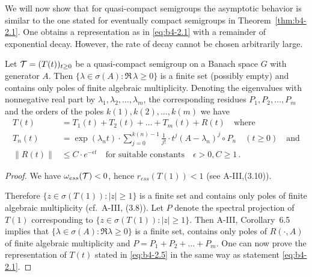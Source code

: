 %
%
We will now show that for quasi-compact semigroups the asymptotic behavior is similar to the one stated for eventually compact semigroups in Theorem~\ref{thm:b4-2.1}. 
One obtains a representation as in \eqref{eq:b4-2.1} with a remainder of exponential decay. 
However, the rate of decay cannot be chosen arbitrarily large.
\begin{theorem}\label{thm:b4-2.10}
	Let $\mathcal{T} = (T(t))_{t \geq 0}$ be a quasi-compact semigroup on a Banach space $G$ with generator $A$. 
    Then $\{\lambda \in \sigma(A) \colon \Re\,\lambda \geq 0\}$ is a finite set (possibly empty) and contains only poles of finite algebraic multiplicity. 
    Denoting the eigenvalues with nonnegative real part by $\lambda_1,\lambda_2, \ldots ,\lambda_m$, the corresponding residues $P_1,P_2, \ldots ,P_m$ and the orders of the poles $k(1),k(2), \ldots, k(m)$ we have
	\begin{equation}\label{eq:b4-2.5}
		\begin{aligned}
		T(t) &= T_1(t) + T_2(t) + \ldots + T_m(t) + R(t) \quad \text{where}\\
		T_n(t) &= \exp(\lambda_nt) \cdot \sum_{j=0}^{k(n)-1} \frac{1}{j!} \cdot t^j (A - \lambda_n)^j \circ P_n \quad (t \geq 0) \quad \text{and}\\
		\|R(t)\| &\leq C \cdot e^{-\epsilon t} \quad \text{for suitable constants} \quad \epsilon > 0, C \geq 1\,.		
		\end{aligned}
	\end{equation}
\end{theorem}

\begin{proof} We have $\omega_{ess}(\mathcal{T}) < 0$, hence $r_{ess}(T(1)) < 1$ (see A-III,(3.10)).

Therefore $\{z \in \sigma(T(1)) \colon |z| \geq 1\}$ is a finite set and contains only poles of finite algebraic multiplicity (cf.\ A-III, (3.8)). 
Let $P$ denote the spectral projection of $T(1)$ corresponding to $\{z \in \sigma(T(1))\colon |z| \geq 1\}$. 
Then A-III, Corollary~6.5 implies that $\{\lambda \in \sigma(A) \colon \Re  \lambda \geq 0\}$ is a finite set, contains only poles of $R(\cdot,A)$ of finite algebraic multiplicity and $P = P_1+P_2+ \ldots +P_m$. 
One can now prove the representation of $T(t)$ stated in \eqref{eq:b4-2.5} in the same way as statement \eqref{eq:b4-2.1}.
\end{proof}


